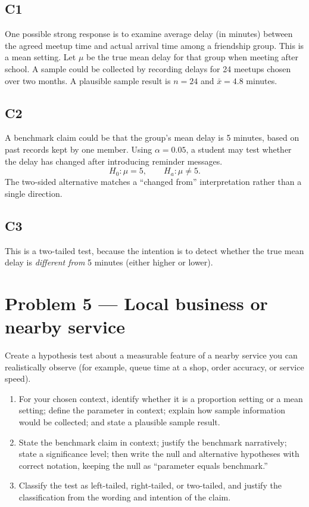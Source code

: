 	\subsection*{C1}
	One possible strong response is to examine average delay (in minutes) between the agreed meetup time and actual arrival time among a friendship group. This is a mean setting. Let \(\mu\) be the true mean delay for that group when meeting after school. A sample could be collected by recording delays for 24 meetups chosen over two months. A plausible sample result is \(n=24\) and \(\bar{x}=4.8\) minutes.
	
	\subsection*{C2}
	A benchmark claim could be that the group's mean delay is 5 minutes, based on past records kept by one member. Using \(\alpha=0.05\), a student may test whether the delay has changed after introducing reminder messages.
	\[
	H_0\colon \mu=5, \qquad H_a\colon \mu\neq 5.
	\]
	The two-sided alternative matches a ``changed from'' interpretation rather than a single direction.
	
	\subsection*{C3}
	This is a two-tailed test, because the intention is to detect whether the true mean delay is \emph{different from} 5 minutes (either higher or lower).


	\section{Problem 5 --- Local business or nearby service}
	Create a hypothesis test about a measurable feature of a nearby service you can realistically observe (for example, queue time at a shop, order accuracy, or service speed).
	
	\begin{enumerate}
		\item[(C1)] For your chosen context, identify whether it is a proportion setting or a mean setting; define the parameter in context; explain how sample information would be collected; and state a plausible sample result.
		\item[(C2)] State the benchmark claim in context; justify the benchmark narratively; state a significance level; then write the null and alternative hypotheses with correct notation, keeping the null as ``parameter equals benchmark.''
		\item[(C3)] Classify the test as left-tailed, right-tailed, or two-tailed, and justify the classification from the wording and intention of the claim.
	\end{enumerate}
	
